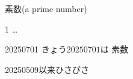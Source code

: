 \documentclass[aspectratio=169,xcolor={dvipsnames,table}]{beamer}
\begin{document}
\begin{frame}[plain]{素数(a prime number)}
\Large

\pause

1\hspace{10pt}\pause
{}\hspace{10pt}\pause
{}\hspace{10pt}\hspace{10pt}\pause
{}\hspace{10pt}\hspace{10pt}\pause
{}\hspace{10pt}\hspace{10pt}\hspace{10pt}\hspace{10pt}\pause
{}\hspace{10pt}\hspace{10pt}\pause
{}\hspace{10pt}\hspace{10pt}\hspace{10pt}\hspace{10pt}\pause
{} \ldots\hspace{10pt}\pause

\bigskip



\end{frame}
\normalsize
\begin{frame}[plain]{20250701}
 \Large
\centering
\pause
\vfill
きょう$20250701$は\pause
素数\pause

\vfill

\hfill{20250509以来ひさびさ}



\end{frame}
\end{document}

